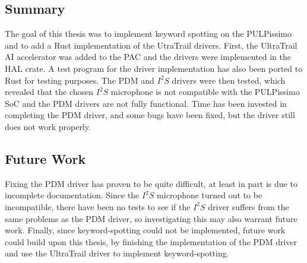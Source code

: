 
\subsection{Summary}

The goal of this thesis was to implement keyword spotting on the PULPissimo and to add a Rust implementation of the UtraTrail drivers.
First, the UltraTrail AI accelerator was added to the PAC and the drivers were implemented in the HAL crate.
A test program for the driver implementation has also been ported to Rust for testing purposes.
The PDM and $I^2S$ drivers were then tested, which revealed that the chosen $I^2S$
microphone is not compatible with the PULPissimo SoC and the PDM drivers are not fully functional.
Time has been invested in completing the PDM driver, and some bugs have been fixed, but the driver still does not work properly.

\subsection{Future Work}

Fixing the PDM driver has proven to be quite difficult, at least in part is due to incomplete documentation.
Since the $I^2S$ microphone turned out to be incompatible, there have been no tests to see if the $I^2S$
driver suffers from the same problems as the PDM driver, so investigating this may also warrant future work.
Finally, since keyword-spotting could not be implemented, future work could build upon this thesis, by finishing
the implementation of the PDM driver and use the UltraTrail driver to implement keyword-spotting.
